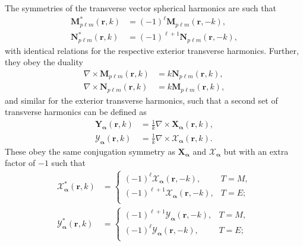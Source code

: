 \documentclass{article}
\begin{document}
The symmetries of the transverse vector spherical harmonics are such that
\begin{equation}
\begin{split}
\mathbf{M}_{p\ell m}^*(\mathbf{r},k) &= (-1)^\ell\mathbf{M}_{p\ell m}(\mathbf{r},-k),\\
\mathbf{N}_{p\ell m}^*(\mathbf{r},k) &= (-1)^{\ell + 1}\mathbf{N}_{p\ell m}(\mathbf{r},-k),
\end{split}
\end{equation}
with identical relations for the respective exterior transverse harmonics. Further, they obey the duality
\begin{equation}
\begin{split}
\nabla\times\mathbf{M}_{p\ell m}(\mathbf{r},k) &= k\mathbf{N}_{p\ell m}(\mathbf{r},k),\\
\nabla\times\mathbf{N}_{p\ell m}(\mathbf{r},k) &= k\mathbf{M}_{p\ell m}(\mathbf{r},k),
\end{split}
\end{equation}
and similar for the exterior transverse harmonics, such that a second set of transverse harmonics can be defined as 
\begin{equation}
\begin{split}
\mathbf{Y}_{\bm{\alpha}}(\mathbf{r},k) &= \frac{1}{k}\nabla\times\mathbf{X}_{\bm{\alpha}}(\mathbf{r},k),\\
\bm{\mathcal{Y}}_{\bm{\alpha}}(\mathbf{r},k) &= \frac{1}{k}\nabla\times\bm{\mathcal{X}}_{\bm{\alpha}}(\mathbf{r},k).
\end{split}
\end{equation}
These obey the same conjugation symmetry as $\mathbf{X}_{\bm{\alpha}}$ and $\bm{\mathcal{X}}_{\bm{\alpha}}$ but with an extra factor of $-1$ such that
\begin{equation}
\begin{split}
\bm{\mathcal{X}}_{\bm{\alpha}}^*(\mathbf{r},k) &= 
\begin{cases}
(-1)^{\ell}\bm{\mathcal{X}}_{\bm{\alpha}}(\mathbf{r},-k), & T = M,\\
(-1)^{\ell + 1}\bm{\mathcal{X}}_{\bm{\alpha}}(\mathbf{r},-k), & T = E;\\
\end{cases}\\
\bm{\mathcal{Y}}_{\bm{\alpha}}^*(\mathbf{r},k) &= 
\begin{cases}
(-1)^{\ell + 1}\bm{\mathcal{Y}}_{\bm{\alpha}}(\mathbf{r},-k), & T = M,\\
(-1)^{\ell}\bm{\mathcal{Y}}_{\bm{\alpha}}(\mathbf{r},-k), & T = E;\\
\end{cases}
\end{split}
\end{equation}
\end{document}
